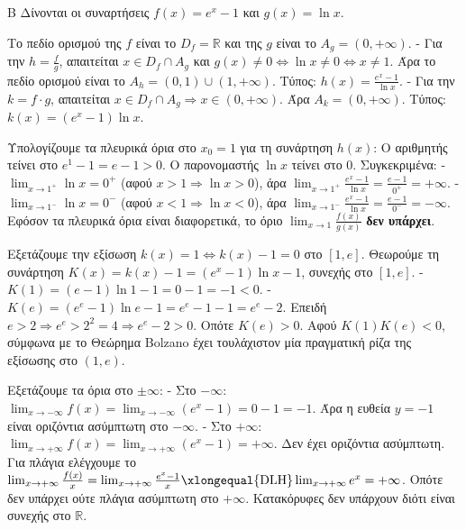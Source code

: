 
\begin{thema}{Β}
Δίνονται οι συναρτήσεις $f(x) = e^x - 1$ και $g(x) = \ln x$. 
\begin{erwthma}
\item Το πεδίο ορισμού της $f$ είναι το $D_f = \mathbb{R}$ και της $g$ είναι το $A_g = (0, +\infty)$.
- Για την $h = \frac{f}{g}$, απαιτείται $x \in D_f \cap A_g$ και $g(x) \ne 0 \Leftrightarrow \ln x \ne 0 \Leftrightarrow x \ne 1$.
Άρα το πεδίο ορισμού είναι το $A_h = (0, 1) \cup (1, +\infty)$. 
Τύπος: $h(x) = \frac{e^x - 1}{\ln x}$.
- Για την $k = f \cdot g$, απαιτείται $x \in D_f \cap A_g \Rightarrow x \in (0, +\infty)$.
Άρα $A_k = (0, +\infty)$. Τύπος: $k(x) = (e^x - 1) \ln x$.

\item Υπολογίζουμε τα πλευρικά όρια στο $x_0 = 1$ για τη συνάρτηση $h(x)$:
Ο αριθμητής τείνει στο $e^1 - 1 = e - 1 > 0$.
Ο παρονομαστής $\ln x$ τείνει στο $0$. Συγκεκριμένα:
- $\lim_{x\to1^+} \ln x = 0^+$ (αφού $x>1 \Rightarrow \ln x > 0$), άρα $\lim_{x\to1^+} \frac{e^x-1}{\ln x} = \frac{e-1}{0^+} = +\infty$.
- $\lim_{x\to1^-} \ln x = 0^-$ (αφού $x<1 \Rightarrow \ln x < 0$), άρα $\lim_{x\to1^-} \frac{e^x-1}{\ln x} = \frac{e-1}{0^-} = -\infty$.
Εφόσον τα πλευρικά όρια είναι διαφορετικά, το όριο $\lim_{x\to1} \frac{f(x)}{g(x)}$ \textbf{δεν υπάρχει}.

\item Εξετάζουμε την εξίσωση $k(x) = 1 \Leftrightarrow k(x) - 1 = 0$ στο $[1, e]$.
Θεωρούμε τη συνάρτηση $K(x) = k(x) - 1 = (e^x-1)\ln x - 1$, συνεχής στο $[1, e]$.
- $K(1) = (e-1)\ln 1 - 1 = 0 - 1 = -1 < 0$.
- $K(e) = (e^e-1)\ln e - 1 = e^e - 1 - 1 = e^e - 2$. Επειδή $e > 2 \Rightarrow e^e > 2^2 = 4 \Rightarrow e^e-2 > 0$. 
Οπότε $K(e) > 0$.
Αφού $K(1)K(e) < 0$, σύμφωνα με το Θεώρημα Bolzano έχει τουλάχιστον μία πραγματική ρίζα της εξίσωσης στο $(1, e)$.

\item Εξετάζουμε τα όρια στο $\pm\infty$:
- Στο $-\infty$: $\lim_{x\to-\infty} f(x) = \lim_{x\to-\infty} (e^x - 1) = 0 - 1 = -1$.
Άρα η ευθεία $y = -1$ είναι οριζόντια ασύμπτωτη στο $-\infty$.
- Στο $+\infty$: $\lim_{x\to+\infty} f(x) = \lim_{x\to+\infty} (e^x - 1) = +\infty$. 
Δεν έχει οριζόντια ασύμπτωτη. Για πλάγια ελέγχουμε το $\lim_{x\to+\infty} \frac{f(x)}{x} = \lim_{x\to+\infty} \frac{e^x-1}{x} \xlongequal{\text{DLH}} \lim_{x\to+\infty} e^x = +\infty$. Οπότε δεν υπάρχει ούτε πλάγια ασύμπτωτη στο $+\infty$. 
Κατακόρυφες δεν υπάρχουν διότι είναι συνεχής στο $\mathbb{R}$.
\end{erwthma}
\end{thema}

